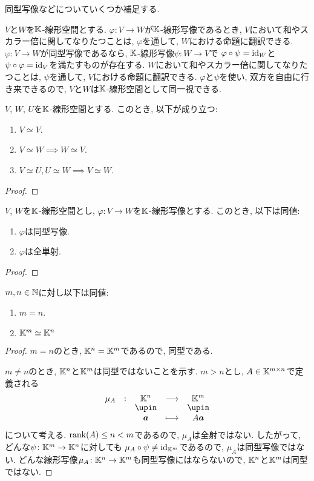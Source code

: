 同型写像などについていくつか補足する.

\begin{remark}
  $V$と$W$を$\mathbb{K}$-線形空間とする.
  $\varphi\colon V\to W$が$\mathbb{K}$-線形写像であるとき,
  $V$において和やスカラー倍に関してなりたつことは,
  $\varphi$を通して, $W$における命題に翻訳できる.
  $\varphi\colon V\to W$が同型写像であるなら,
  $\mathbb{K}$-線形写像$\psi\colon W\to V$で
  $\varphi\circ \psi=\operatorname{id}_W$と
  $\psi\circ \varphi=\operatorname{id}_V$を満たすものが存在する.
  $W$において和やスカラー倍に関してなりたつことは,
  $\psi$を通して, $V$における命題に翻訳できる.
  $\varphi$と$\psi$を使い, 双方を自由に行き来できるので,
  $V$と$W$は$\mathbb{K}$-線形空間として同一視できる.
\end{remark}

\begin{prop}
  $V$, $W$, $U$を$\mathbb{K}$-線形空間とする.
  このとき, 以下が成り立つ:
  \begin{enumerate}
  \item $V\simeq V$.
  \item $V\simeq W \implies W\simeq V$.
  \item $V\simeq U, U\simeq W \implies V\simeq W$.
  \end{enumerate}
\end{prop}
\begin{proof}\end{proof}

\begin{prop}
  $V$, $W$を$\mathbb{K}$-線形空間とし, $\varphi\colon V\to W$を$\mathbb{K}$-線形写像とする.
  このとき, 以下は同値:
  \begin{enumerate}
  \item $\varphi$は同型写像.
  \item $\varphi$は全単射.
  \end{enumerate}
\end{prop}
\begin{proof}\end{proof}

\begin{example}
   $m,n\in\mathbb{N}$に対し以下は同値:
  \begin{enumerate}
  \item $m=n$.
  \item $\mathbb{K}^m \simeq \mathbb{K}^n$
  \end{enumerate}
\end{example}
\begin{proof}
  $m=n$のとき, $\mathbb{K}^n=\mathbb{K}^m$であるので, 同型である.

  $m\neq n$のとき, $\mathbb{K}^n$と$\mathbb{K}^m$は同型ではないことを示す.
  $m>n$とし, $A\in \mathbb{K}^{m\times n}$で定義される
  \begin{align*}
    \shazo{\mu_A}{\KK^n}{\KK^m}
    {\aaa}{A\aaa}
  \end{align*}
  について考える.
  $\operatorname{rank}(A)\leq n<m$であるので, $\mu_A$は全射ではない.
  したがって,
  どんな$\psi\colon \mathbb{K}^m\to \mathbb{K}^n$に対しても
  $\mu_A\circ\psi\neq \operatorname{id}_{\mathbb{K}^m}$であるので,
  $\mu_A$は同型写像ではない.
  どんな線形写像$\mu_A\colon \mathbb{K}^n \to \mathbb{K}^m$も同型写像にはならないので,
  $\mathbb{K}^n$と$\mathbb{K}^m$は同型ではない.
\end{proof}

